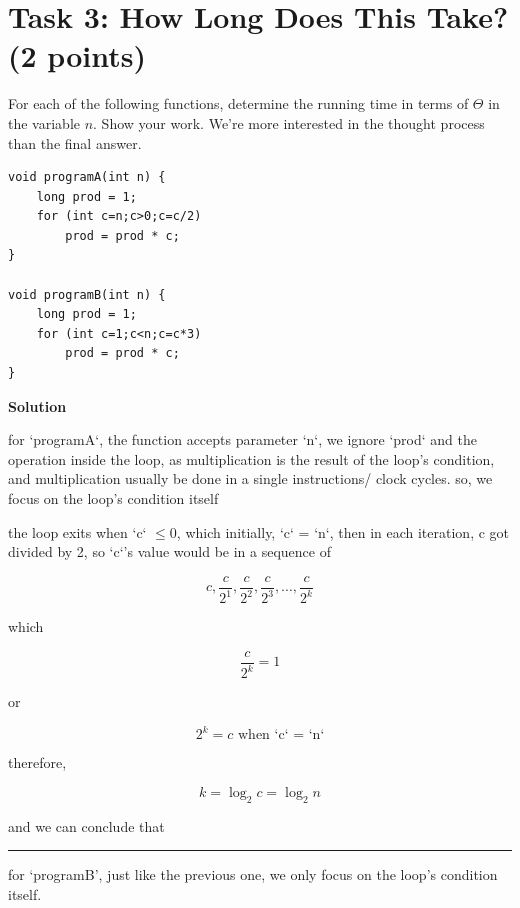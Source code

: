 \documentclass{article}
\newcommand{\solution}{\textbf{\large Solution}}
\theoremstyle{remark}
\begin{document}
\vspace{1em}
\hrulefill

\section*{Task 3: How Long Does This Take? (2 points)}

For each of the following functions, determine the running time in terms of $\Theta$ in the variable $n$. Show your work. We’re more interested in the thought process than the final answer.

\begin{verbatim}
void programA(int n) {
    long prod = 1;
    for (int c=n;c>0;c=c/2)
        prod = prod * c;
}

void programB(int n) {
    long prod = 1;
    for (int c=1;c<n;c=c*3)
        prod = prod * c;
}
\end{verbatim}

\medskip
\solution

for `programA`, the function accepts parameter `n`, we ignore `prod` and the operation inside the loop, as multiplication is the result of the loop's condition, and multiplication usually be done in a single instructions/ clock cycles. so, we focus on the loop's condition itself

\vspace{1em}

the loop exits when `c` $\le 0$, which initially, `c` = `n`, then in each iteration, c got divided by 2, so `c`'s value would be in a sequence of

\[c, \frac{c}{2^1}, \frac{c}{2^2}, \frac{c}{2^3}, ..., \frac{c}{2^k}\]

which 

\[\frac{c}{2^k} = 1\]

or

\[2^k = c \text{ when `c` = `n`}\]

therefore, 

\[k = \log_2 c = \log_2 n\]

and we can conclude that 

    \medskip
    \begin{center}
    \rule{0.3\linewidth}{0.2pt}
    \end{center}
    \medskip

for `programB', just like the previous one, we only focus on the loop's condition itself.

\vspace{1em}
\end{document}
